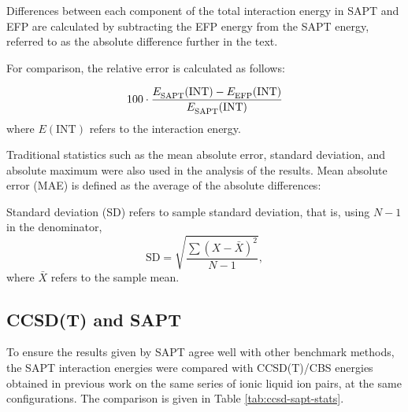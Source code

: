 

Differences between each component of the total interaction energy in SAPT and EFP are calculated by subtracting the EFP energy from the SAPT energy, referred to as the absolute difference further in the text.


For comparison, the relative error is calculated as follows: 

\begin{equation}
    100 \cdot \frac{  E^{\text{}}_{\text{SAPT}} (\text{INT}) -  E^{\text{}}_{\text{EFP}} (\text{INT}) } {  E^{\text{}}_{\text{SAPT}} (\text{INT})} 
\end{equation}
where $E(\text{INT})$ refers to the interaction energy.

Traditional statistics such as the mean absolute error, standard deviation, and absolute maximum were also used in the analysis of the results. 
Mean absolute error (MAE) is defined as the average of the absolute differences:


Standard deviation (SD) refers to sample standard deviation, that is, using $N-1$ in the denominator,
\begin{equation}
    \text{SD} = \sqrt{\frac{\sum (X - \bar{X})^2}{N-1}} ,
\end{equation}
where $\bar{X} $ refers to the sample mean.



\subsection{CCSD(T) and SAPT}
\label{subsec:ccsd}
To ensure the results given by SAPT agree well with other benchmark methods, the SAPT interaction energies were compared with CCSD(T)/CBS energies obtained in previous work 
\cite{Rigby2014a}
on the same series of ionic liquid ion pairs, at the same configurations. The comparison is given in Table \ref{tab:ccsd-sapt-stats}.


